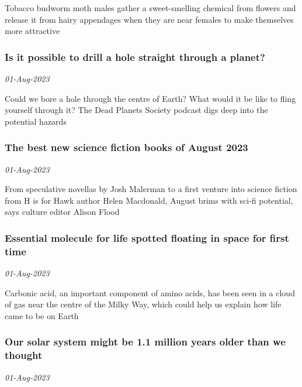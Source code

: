 Tobacco budworm moth males gather a sweet-smelling chemical from flowers and release it from hairy appendages when they are near females to make themselves more attractive
\subsubsection{Is it possible to drill a hole straight through a planet? \href{https://www.newscientist.com/article/2385526-is-it-possible-to-drill-a-hole-straight-through-a-planet/?utm_campaign=RSS%7CNSNS&utm_source=NSNS&utm_medium=RSS&utm_content=home}{\ding{225}}}
\textit{01-Aug-2023}

Could we bore a hole through the centre of Earth? What would it be like to fling yourself through it? The Dead Planets Society podcast digs deep into the potential hazards
\subsubsection{The best new science fiction books of August 2023 \href{https://www.newscientist.com/article/2385317-the-best-new-science-fiction-books-of-august-2023/?utm_campaign=RSS%7CNSNS&utm_source=NSNS&utm_medium=RSS&utm_content=home}{}}
\textit{01-Aug-2023}

From speculative novellas by Josh Malerman to a first venture into science fiction from H is for Hawk author Helen Macdonald, August brims with sci-fi potential, says culture editor Alison Flood
\subsubsection{Essential molecule for life spotted floating in space for first time \href{https://www.newscientist.com/article/2384657-essential-molecule-for-life-spotted-floating-in-space-for-first-time/?utm_campaign=RSS%7CNSNS&utm_source=NSNS&utm_medium=RSS&utm_content=home}{\ding{225}}}
\textit{01-Aug-2023}

Carbonic acid, an important component of amino acids, has been seen in a cloud of gas near the centre of the Milky Way, which could help us explain how life came to be on Earth
\subsubsection{Our solar system might be 1.1 million years older than we thought \href{https://www.newscientist.com/article/2385393-our-solar-system-might-be-1-1-million-years-older-than-we-thought/?utm_campaign=RSS%7CNSNS&utm_source=NSNS&utm_medium=RSS&utm_content=home}{}}
\textit{01-Aug-2023}

